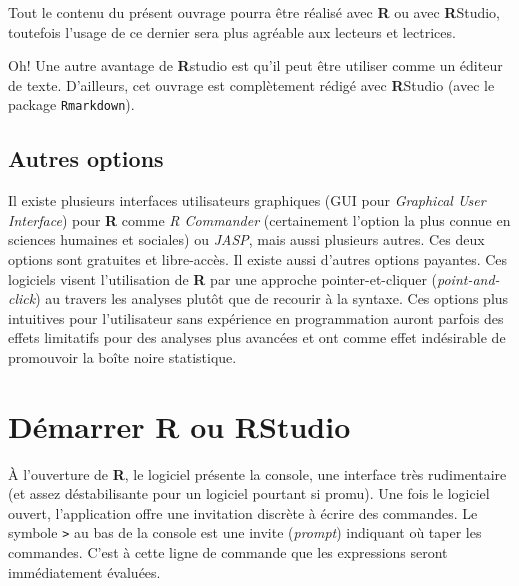 \documentclass[
]{book}
\begin{document}
Tout le contenu du présent ouvrage pourra être réalisé avec \textbf{R} ou avec \textbf{R}Studio, toutefois l'usage de ce dernier sera plus agréable aux lecteurs et lectrices.

Oh! Une autre avantage de \textbf{R}studio est qu'il peut être utiliser comme un éditeur de texte. D'ailleurs, cet ouvrage est complètement rédigé avec \textbf{R}Studio (avec le package \texttt{Rmarkdown}).

\hypertarget{autres-options}{%
\subsection{Autres options}\label{autres-options}}

Il existe plusieurs interfaces utilisateurs graphiques (GUI pour \emph{Graphical User Interface}) pour \textbf{R} comme \emph{R Commander} (certainement l'option la plus connue en sciences humaines et sociales) ou \emph{JASP}, mais aussi plusieurs autres. Ces deux options sont gratuites et libre-accès. Il existe aussi d'autres options payantes. Ces logiciels visent l'utilisation de \textbf{R} par une approche pointer-et-cliquer (\emph{point-and-click}) au travers les analyses plutôt que de recourir à la syntaxe. Ces options plus intuitives pour l'utilisateur sans expérience en programmation auront parfois des effets limitatifs pour des analyses plus avancées et ont comme effet indésirable de promouvoir la boîte noire statistique.

\hypertarget{duxe9marrer-r-ou-rstudio}{%
\section{\texorpdfstring{Démarrer \textbf{R} ou \textbf{R}Studio}{Démarrer R ou RStudio}}\label{duxe9marrer-r-ou-rstudio}}

À l'ouverture de \textbf{R}, le logiciel présente la console, une interface très rudimentaire (et assez déstabilisante pour un logiciel pourtant si promu). Une fois le logiciel ouvert, l'application offre une invitation discrète à écrire des commandes. Le symbole \texttt{\textgreater{}} au bas de la console est une invite (\emph{prompt}) indiquant où taper les commandes. C'est à cette ligne de commande que les expressions seront immédiatement évaluées.
\end{document}
